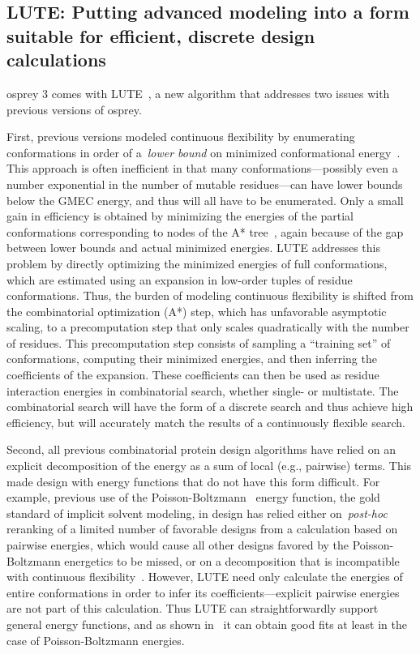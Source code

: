 \subsection{LUTE: Putting advanced modeling into a form suitable for efficient, discrete design calculations}

{\sc osprey} 3 comes with LUTE~\cite{LUTE_RECOMB}, a new algorithm that addresses two issues with previous versions of {\sc osprey}.  

First, previous versions modeled continuous flexibility by enumerating conformations in order of a~\textit{lower bound} on minimized conformational energy~\cite{minDEE,iMinDEE}.  This approach is often inefficient in that many conformations---possibly even a number exponential in the number of mutable residues---can have lower bounds below the GMEC energy, and thus will all have to be enumerated.  Only a small gain in efficiency is obtained by minimizing the energies of the partial conformations corresponding to nodes of the A* tree~\cite{EPIC}, again because of the gap between lower bounds and actual minimized energies.  LUTE addresses this problem by directly optimizing the minimized energies of full conformations, which are estimated using an expansion in low-order tuples of residue conformations.  Thus, the burden of modeling continuous flexibility is shifted from the combinatorial optimization (A*) step, which has unfavorable asymptotic scaling, to a precomputation step that only scales quadratically with the number of residues.  This precomputation step consists of sampling a ``training set'' of conformations, computing their minimized energies, and then inferring the coefficients of the expansion.  These coefficients can then be used as residue interaction energies in combinatorial search, whether single- or multistate.  The combinatorial search will have the form of a discrete search and thus achieve high efficiency, but will accurately match the results of a continuously flexible search.  

Second, all previous combinatorial protein design algorithms have relied on an explicit decomposition of the energy as a sum of local (e.g., pairwise) terms.  This made design with energy functions that do not have this form difficult. For example, previous use of the Poisson-Boltzmann~\cite{PBSA} energy function, the gold standard of implicit solvent modeling, in design has relied either on~\textit{post-hoc} reranking of a limited number of favorable designs from a calculation based on pairwise energies, which would cause all other designs favored by the Poisson-Boltzmann energetics to be missed, or on a decomposition that is incompatible with continuous flexibility~\cite{PB_pairwise}.  However, LUTE need only calculate the energies of entire conformations in order to infer its coefficients---explicit pairwise energies are not part of this calculation.  Thus LUTE can straightforwardly support general energy functions, and as shown in~\cite{LUTE_RECOMB} it can obtain good fits at least in the case of Poisson-Boltzmann energies.  

